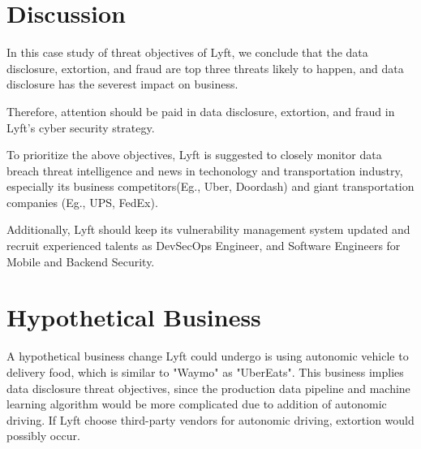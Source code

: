 \documentclass[11pt]{article}
\begin{document}
\section{Discussion}


In this case study of threat objectives of Lyft, we conclude that the data disclosure, extortion, and fraud are top three threats likely to happen, and data disclosure has the severest impact on business.

Therefore, attention should be paid in data disclosure, extortion, and fraud in Lyft's cyber security strategy.

To prioritize the above objectives, Lyft is suggested to closely monitor data breach threat intelligence and news in techonology and transportation industry, especially its business competitors(Eg., Uber, Doordash) and giant transportation companies (Eg., UPS, FedEx). 

Additionally, Lyft should keep its vulnerability management system updated and recruit experienced talents as DevSecOps Engineer, and Software Engineers for Mobile and Backend Security.




\section{Hypothetical Business}

A hypothetical business change Lyft could undergo is using autonomic vehicle to delivery food, which is similar to "Waymo" as "UberEats". This business implies data disclosure threat objectives, since the production data pipeline and machine learning algorithm would be more complicated due to addition of autonomic driving. If Lyft choose third-party vendors for autonomic driving, extortion would possibly occur.



\end{document}
